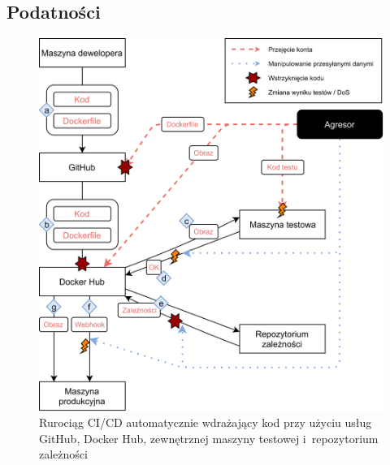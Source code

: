 \subsection{Podatności}

\begin{figure}[ht]
    \centering
    \includegraphics[width=0.9\linewidth]{images/pipeline.png}
    \caption{Rurociąg CI/CD automatycznie wdrażający kod przy użyciu usług GitHub, Docker Hub, zewnętrznej maszyny testowej i~repozytorium zależności}
    \label{fig:pipeline}
\end{figure}

